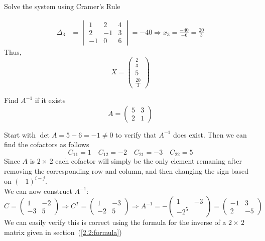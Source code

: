 \begin{example}{Solve the system using Cramer's Rule}{}
\begin{solution}
\begin{align*}
            \Delta_3 &= \begin{vmatrix}
                1 & 2 & 4 \\
                2 & -1 & 3 \\
                -1 & 0 & 6
            \end{vmatrix}
            = -40 \Rightarrow x_3 = \frac{-40}{-6} = \frac{20}{3}
        \end{align*}
        Thus, 
        \[X = \begin{pmatrix}
            \frac{2}{3} \\ 5 \\ \frac{20}{3}
        \end{pmatrix}\]
    \end{solution}
\end{example}

\begin{example}{Find $A^{-1}$ if it exists}{}
    \[A = \begin{pmatrix}
        5 & 3 \\ 2 & 1
    \end{pmatrix}\] 
    \begin{solution}
        Start with $\det{A} = 5 - 6 = -1 \neq 0$ to verify that $A^{-1}$ does exist. Then we can find the cofactors as follows 
        \[C_{11} = 1 \quad C_{12} = -2 \quad C_{21} = -3 \quad C_{22} = 5\]
        Since $A$ is $2\times\,2$ each cofactor will simply be the only element remaning after removing the corresponding row and column, and then changing the sign based on $\left(-1\right)^{i-j}$. \\ We can now construct $A^{-1}$:
        \[
            C = \begin{pmatrix}
                1 & -2 \\ -3 & 5
            \end{pmatrix}
            \Rightarrow 
            C^{T} = \begin{pmatrix}
                1 & -3 \\
                -2 & 5
            \end{pmatrix}
            \Rightarrow
            A^{-1} = -\begin{pmatrix}
                1 & -3 \\ -2 ^ 5 
            \end{pmatrix}
            = \begin{pmatrix}
                -1 & 3 \\ 2 & -5
            \end{pmatrix}
        \]
        We can easily verify this is correct using the formula for the inverse of a $2\times\,2$ matrix given in section~(\ref{2.2:formula})
    \end{solution}
\end{example}

